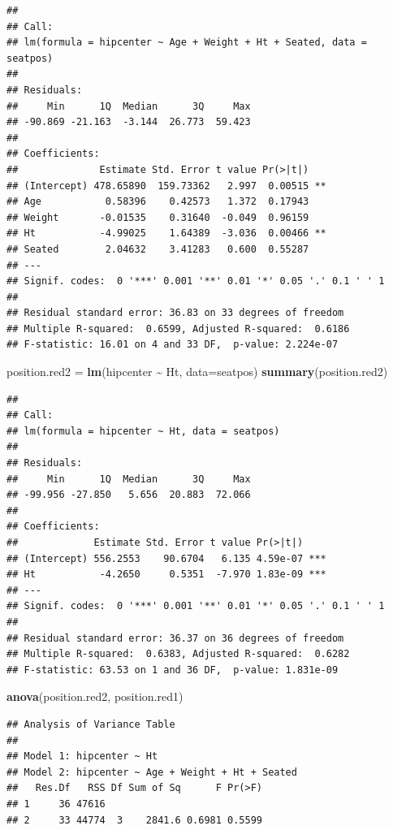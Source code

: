 \documentclass[
]{book}
\newenvironment{Shaded}{\begin{snugshade}}{\end{snugshade}}
\newcommand{\AttributeTok}[1]{\textcolor[rgb]{0.13,0.29,0.53}{#1}}
\newcommand{\FunctionTok}[1]{\textcolor[rgb]{0.13,0.29,0.53}{\textbf{#1}}}
\newcommand{\NormalTok}[1]{#1}
\newcommand{\OtherTok}[1]{\textcolor[rgb]{0.56,0.35,0.01}{#1}}
\newcommand{\SpecialCharTok}[1]{\textcolor[rgb]{0.81,0.36,0.00}{\textbf{#1}}}
\begin{document}
\begin{verbatim}
## 
## Call:
## lm(formula = hipcenter ~ Age + Weight + Ht + Seated, data = seatpos)
## 
## Residuals:
##     Min      1Q  Median      3Q     Max 
## -90.869 -21.163  -3.144  26.773  59.423 
## 
## Coefficients:
##              Estimate Std. Error t value Pr(>|t|)   
## (Intercept) 478.65890  159.73362   2.997  0.00515 **
## Age           0.58396    0.42573   1.372  0.17943   
## Weight       -0.01535    0.31640  -0.049  0.96159   
## Ht           -4.99025    1.64389  -3.036  0.00466 **
## Seated        2.04632    3.41283   0.600  0.55287   
## ---
## Signif. codes:  0 '***' 0.001 '**' 0.01 '*' 0.05 '.' 0.1 ' ' 1
## 
## Residual standard error: 36.83 on 33 degrees of freedom
## Multiple R-squared:  0.6599, Adjusted R-squared:  0.6186 
## F-statistic: 16.01 on 4 and 33 DF,  p-value: 2.224e-07
\end{verbatim}

\begin{Shaded}
\begin{Highlighting}[]
\NormalTok{position.red2 }\OtherTok{=} \FunctionTok{lm}\NormalTok{(hipcenter }\SpecialCharTok{\textasciitilde{}}\NormalTok{ Ht, }\AttributeTok{data=}\NormalTok{seatpos)}
\FunctionTok{summary}\NormalTok{(position.red2)}
\end{Highlighting}
\end{Shaded}

\begin{verbatim}
## 
## Call:
## lm(formula = hipcenter ~ Ht, data = seatpos)
## 
## Residuals:
##     Min      1Q  Median      3Q     Max 
## -99.956 -27.850   5.656  20.883  72.066 
## 
## Coefficients:
##             Estimate Std. Error t value Pr(>|t|)    
## (Intercept) 556.2553    90.6704   6.135 4.59e-07 ***
## Ht           -4.2650     0.5351  -7.970 1.83e-09 ***
## ---
## Signif. codes:  0 '***' 0.001 '**' 0.01 '*' 0.05 '.' 0.1 ' ' 1
## 
## Residual standard error: 36.37 on 36 degrees of freedom
## Multiple R-squared:  0.6383, Adjusted R-squared:  0.6282 
## F-statistic: 63.53 on 1 and 36 DF,  p-value: 1.831e-09
\end{verbatim}

\begin{Shaded}
\begin{Highlighting}[]
\FunctionTok{anova}\NormalTok{(position.red2, position.red1)}
\end{Highlighting}
\end{Shaded}

\begin{verbatim}
## Analysis of Variance Table
## 
## Model 1: hipcenter ~ Ht
## Model 2: hipcenter ~ Age + Weight + Ht + Seated
##   Res.Df   RSS Df Sum of Sq      F Pr(>F)
## 1     36 47616                           
## 2     33 44774  3    2841.6 0.6981 0.5599
\end{verbatim}
\end{document}
